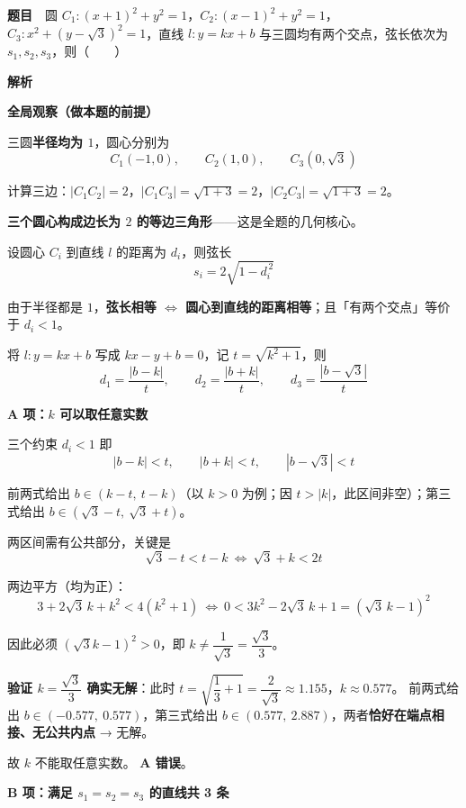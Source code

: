 \par\medskip


\textbf{题目}　圆 $C_1:(x+1)^2+y^2=1$，$C_2:(x-1)^2+y^2=1$，$C_3:x^2+(y-\sqrt3)^2=1$，直线 $l:y=kx+b$ 与三圆均有两个交点，弦长依次为 $s_1,s_2,s_3$，则（　　）

\textbf{解析}

\textbf{全局观察（做本题的前提）}

三圆\textbf{半径均为 $1$}，圆心分别为
\[C_1(-1,0),\qquad C_2(1,0),\qquad C_3(0,\sqrt3)\]

计算三边：$|C_1C_2|=2$，$|C_1C_3|=\sqrt{1+3}=2$，$|C_2C_3|=\sqrt{1+3}=2$。

\textbf{三个圆心构成边长为 $2$ 的等边三角形}——这是全题的几何核心。

设圆心 $C_i$ 到直线 $l$ 的距离为 $d_i$，则弦长
\[s_i=2\sqrt{1-d_i^{\,2}}\]

由于半径都是 $1$，\textbf{弦长相等 $\iff$ 圆心到直线的距离相等}；且「有两个交点」等价于 $d_i<1$。

将 $l:y=kx+b$ 写成 $kx-y+b=0$，记 $t=\sqrt{k^2+1}$，则
\[d_1=\frac{|b-k|}{t},\qquad d_2=\frac{|b+k|}{t},\qquad d_3=\frac{|b-\sqrt3|}{t}\]

\par\medskip

\textbf{A 项：$k$ 可以取任意实数}

三个约束 $d_i<1$ 即
\[|b-k|<t,\qquad |b+k|<t,\qquad |b-\sqrt3|<t\]

前两式给出 $b\in(k-t,\ t-k)$（以 $k>0$ 为例；因 $t>|k|$，此区间非空）；第三式给出 $b\in(\sqrt3-t,\ \sqrt3+t)$。

两区间需有公共部分，关键是
\[\sqrt3-t<t-k\ \Longleftrightarrow\ \sqrt3+k<2t\]

两边平方（均为正）：
\[3+2\sqrt3\,k+k^2<4\left(k^2+1\right)\ \Longleftrightarrow\ 0<3k^2-2\sqrt3\,k+1=\left(\sqrt3\,k-1\right)^2\]

因此必须 $\left(\sqrt3 k-1\right)^2>0$，即 $k\ne\dfrac{1}{\sqrt3}=\dfrac{\sqrt3}{3}$。

\textbf{验证 $k=\dfrac{\sqrt3}{3}$ 确实无解}：此时 $t=\sqrt{\dfrac13+1}=\dfrac{2}{\sqrt3}\approx1.155$，$k\approx0.577$。
前两式给出 $b\in(-0.577,\ 0.577)$，第三式给出 $b\in(0.577,\ 2.887)$，两者\textbf{恰好在端点相接、无公共内点} → 无解。

故 $k$ 不能取任意实数。 \textbf{A 错误}。

\par\medskip

\textbf{B 项：满足 $s_1=s_2=s_3$ 的直线共 3 条}

